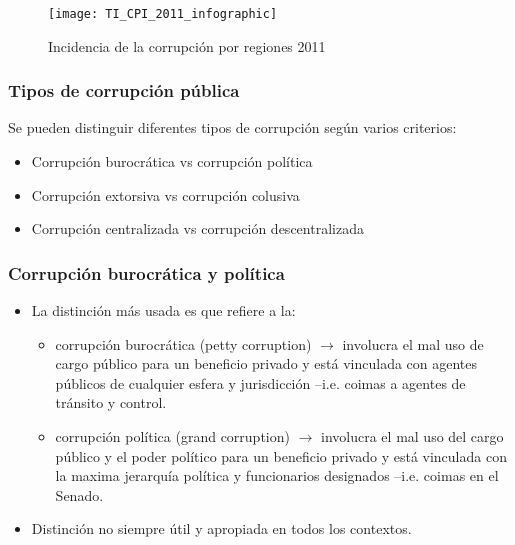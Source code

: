 \documentclass[handout,final,xcolor=dvipsnames]{beamer}
\begin{document}
\begin{frame}
 \begin{figure}[htbp]
    \centering
    \texttt{[image: TI\_CPI\_2011\_infographic]}
    \caption{Incidencia de la corrupción por regiones 2011}
    \label{fig:corrupcionlarge}
  \end{figure}
\end{frame}


\begin{frame}\frametitle{Tipos de corrupción pública}
Se pueden distinguir diferentes tipos de corrupción según varios
criterios:
\begin{itemize}\itemsep 10pt
\item Corrupción burocrática vs corrupción política
\item Corrupción extorsiva vs corrupción colusiva
\item Corrupción centralizada vs corrupción descentralizada
\end{itemize}
\end{frame}


\begin{frame}\frametitle{Corrupción burocrática y política}
\begin{itemize}\itemsep 10pt
\item La distinción más usada es que refiere a la:
\begin{itemize}\itemsep 10pt
\item corrupción burocrática (petty corruption) $\longrightarrow$ involucra el mal uso de
  cargo público para un beneficio privado y está vinculada con agentes
  públicos de cualquier esfera y jurisdicción --i.e. coimas a agentes
  de tránsito y control. 
\item corrupción política (grand corruption) $\longrightarrow$ involucra el mal uso del
  cargo público y el poder político para un beneficio privado y está
  vinculada con la maxima jerarquía política y funcionarios
  designados --i.e. coimas en el Senado. 
\end{itemize}
\item Distinción no siempre útil y apropiada en todos los contextos. 
\end{itemize}
\end{frame}
\end{document}
